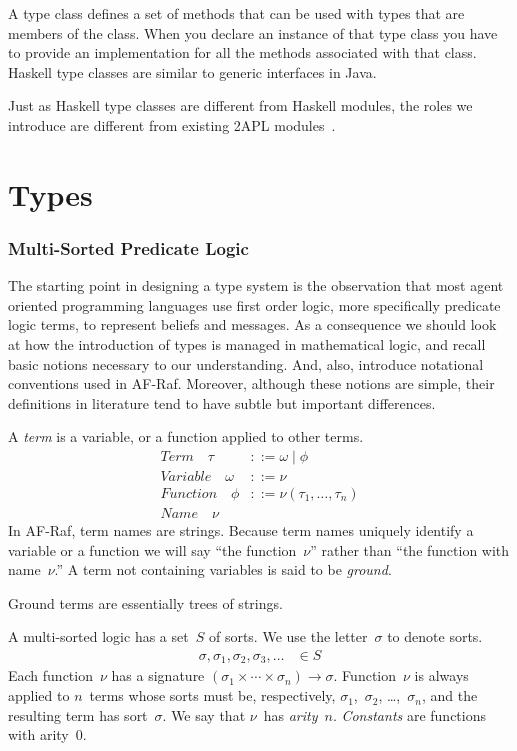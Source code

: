 \documentclass[a4paper,12pt,oneside,fleqn]{book} %
\newcommand{\todo}[1]{[\textcolor{red}{TODO}: #1]}
\begin{document}
A type class defines a set of methods that can be used with types that are
members of the class. When you declare an instance of that type class
you have to provide an implementation for all the methods associated with
that class. Haskell type classes are similar to generic interfaces in Java.

Just as Haskell type classes are different from Haskell modules, the roles
we introduce are different from existing 2APL
modules~\cite{dblp:conf/prima/dastanims08}.
\chapter{Types} %
\subsection{Multi-Sorted Predicate Logic} \label{sec:multi-sorted} %

The starting point in designing a type system is the observation that most
agent oriented programming languages use first order logic, more
specifically predicate logic terms, to represent beliefs and messages. As a
consequence we should look at how the introduction of types is managed in
mathematical logic, and recall basic notions necessary to our
understanding. And, also, introduce notational conventions used in AF-Raf.
Moreover, although these notions are simple, their definitions in
literature tend to have subtle but important differences.

A \emph{term} is a variable, or a function applied to other terms.
\begin{align}
\mathit{Term}\quad\tau &::= \omega \mid \phi \\
\mathit{Variable}\quad\omega &::= \nu \\
\mathit{Function}\quad\phi &::= \nu(\tau_1,\ldots,\tau_n) \\
\mathit{Name}\quad\nu
\end{align}
In AF-Raf, term names are strings.  Because term names uniquely identify a
variable or a function we will say ``the function~$\nu$'' rather than ``the
function with name~$\nu$.'' A term not containing variables is said to be
\emph{ground}.

\begin{remark}
Ground terms are essentially trees of strings.
\end{remark}

A multi-sorted logic has a set~$S$ of sorts.  We use the letter~$\sigma$ to
denote sorts.
\begin{align}
\sigma, \sigma_1, \sigma_2, \sigma_3, \ldots &\in S
\end{align}
Each function~$\nu$ has a signature
$(\sigma_1\times\cdots\times\sigma_n)\to\sigma$.  Function~$\nu$ is always
applied to $n$~terms whose sorts must be, respectively,
$\sigma_1$,~$\sigma_2$, \dots,~$\sigma_n$, and the resulting term has
sort~$\sigma$. We say that $\nu$~has \emph{arity}~$n$. \emph{Constants} are
functions with arity~$0$.
\end{document}
